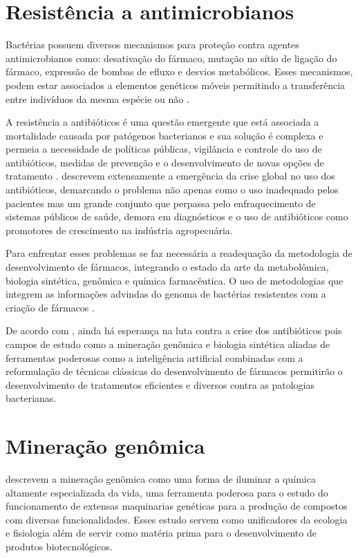 \section{Resistência a antimicrobianos}
Bactérias possuem diversos mecanismos para proteção contra agentes antimicrobianos como: desativação do fármaco, 
mutação no sítio de ligação do fármaco, expressão de bombas de efluxo e desvios metabólicos. Esses mecanismos, podem
estar associados a elementos genéticos móveis permitindo a transferência entre indivíduos da mesma espécie ou não \cite[p. 150]{Madigan2021}.

A resistência a antibióticos é uma questão emergente que está associada a mortalidade causada por patógenos bacterianos e sua solução
é complexa e permeia a necessidade de políticas públicas, vigilância e controle do uso de antibióticos, medidas de prevenção 
e o desenvolvimento de novas opções de tratamento \cite{frieri2017antibiotic}.   descrevem
extensamente a emergência da crise global no uso dos antibióticos, demarcando o problema não apenas como 
o uso inadequado pelos pacientes mas um grande conjunto que perpassa pelo enfraquecimento de sistemas
públicos de saúde, demora em diagnósticos e o uso de antibióticos como promotores de crescimento
na indústria agropecuária.

Para enfrentar esses problemas se faz necessária a readequação da metodologia de desenvolvimento
de fármacos, integrando o estado da arte da metabolômica, biologia sintética, genômica e química farmacêutica.
O uso de metodologias que integrem as informações advindas do genoma de bactérias resistentes 
com a criação de fármacos \cite{brown2016antibacterial}.

De acordo com , ainda há esperança na luta contra a crise dos antibióticos pois
 campos de estudo como a mineração genômica e biologia sintética aliadas de ferramentas poderosas como
a inteligência artificial combinadas com a reformulação de técnicas clássicas do desenvolvimento de fármacos
permitirão o desenvolvimento de tratamentos eficientes e diversos contra as patologias bacterianas. 

\section{Mineração genômica}
 descrevem a mineração genômica como uma forma de iluminar a química
altamente especializada da vida, uma ferramenta poderosa para o estudo do funcionamento de extensas
maquinarias genéticas para a produção de compostos com diversas funcionalidades. Esses estudo servem
como unificadores da ecologia e fisiologia além de servir como matéria prima para o desenvolvimento
de produtos biotecnológicos.

